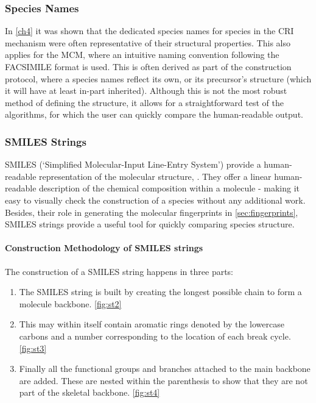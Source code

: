 \subsubsection{Species Names}
In \autoref{ch4} it was shown that the dedicated species names for species in the CRI mechanism were often representative of their structural properties. This also applies for the MCM, where an intuitive naming convention following the FACSIMILE format is used. This is often derived as part of the construction protocol, where a species names reflect its own, or its precursor's structure (which it will have at least in-part inherited). Although this is not the most robust method of defining the structure, it allows for a straightforward test of the algorithms, for which the user can quickly compare the human-readable output.


\subsubsection{SMILES Strings}\label{sec:SMILES}


 SMILES (`Simplified Molecular-Input Line-Entry System') provide a human-readable representation of the molecular structure, \citep{smiles}. They offer a linear human-readable description of the chemical composition within a molecule - making it easy to visually check the construction of a species without any additional work. Besides, their role in generating the molecular fingerprints in \autoref{sec:fingerprints}, SMILES strings provide a useful tool for quickly comparing species structure.

\paragraph*{Construction Methodology of SMILES strings}
The construction of a SMILES string happens in three parts:

\begin{enumerate}
    \item The SMILES string is built by creating the longest possible chain to form a molecule backbone.
    \autoref{fig:st2}

    \item This may within itself contain aromatic rings denoted by the lowercase carbons and a number corresponding to the location of each break cycle. \autoref{fig:st3}

    \item Finally all the functional groups and branches attached to the main backbone are added. These are nested within the parenthesis to show that they are not part of the skeletal backbone. \autoref{fig:st4}
\end{enumerate}



